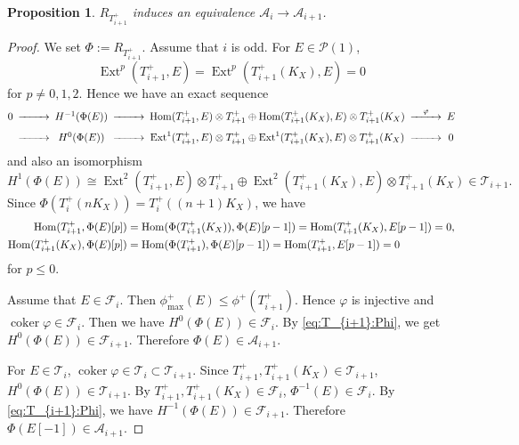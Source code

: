 \documentclass[leqno,11pt]{amsart}
\def\Ext{\mathop{\mathrm{Ext}}\nolimits}
\def\Hom{\mathop{\mathrm{Hom}}\nolimits}
\def\coker{\mathop{\mathrm{coker}}\nolimits}
\newtheorem{Prop}[Thm]{Proposition}
\theoremstyle{definition}
\def\AA{\ensuremath{\mathcal A}}
\def\FF{\ensuremath{\mathcal F}}
\def\PP{\ensuremath{\mathcal P}}
\def\TT{\ensuremath{\mathcal T}}
\begin{document}
\begin{Prop}\label{Prop:equiv1-2}
$R_{T_{i+1}^+}$ induces an equivalence
$\AA_i \to \AA_{i+1}$.
\end{Prop}

\begin{proof}
We set $\Phi:=R_{T_{i+1}^+}$.
Assume that $i$ is odd.
For $E \in \PP(1)$, 
$$
\Ext^p(T_{i+1}^+,E)=\Ext^p(T_{i+1}^+(K_X),E)=0
$$
 for $p \ne 0,1,2$.
Hence we have an exact sequence
\begin{equation}
\begin{CD}
0 @>>> H^{-1}(\Phi(E)) @>>> \Hom(T_{i+1}^+,E) \otimes T_{i+1}^+ \oplus  
\Hom(T_{i+1}^+(K_X),E) \otimes T_{i+1}^+ (K_X) @>{\varphi}>> E \\
 @>>> H^0(\Phi(E)) @>>> \Ext^1(T_{i+1}^+,E) \otimes T_{i+1}^+ \oplus  
\Ext^1(T_{i+1}^+(K_X),E) \otimes T_{i+1}^+ (K_X) @>>> 0
\end{CD}
\end{equation}
and also an isomorphism
\begin{equation}
H^1(\Phi(E)) \cong \Ext^2(T_{i+1}^+,E) \otimes T_{i+1}^+\oplus  
\Ext^2(T_{i+1}^+(K_X),E) \otimes T_{i+1}^+ (K_X) \in \TT_{i+1}.
\end{equation}
Since $\Phi(T_i^+ (nK_X))=T_i^+((n+1)K_X)$, we have
\begin{equation}\label{eq:T_{i+1}:Phi}
\begin{split}
\Hom(T_{i+1}^+,\Phi(E)[p])& =\Hom(\Phi(T_{i+1}^+(K_X)),\Phi(E)[p-1])
=\Hom(T_{i+1}^+(K_X),E[p-1])=0,\\
\Hom(T_{i+1}^+(K_X),\Phi(E)[p])&=\Hom(\Phi(T_{i+1}^+),\Phi(E)[p-1])
=\Hom(T_{i+1}^+,E[p-1])=0
\end{split}
\end{equation}
for $p \leq 0$.

Assume that $E \in \FF_i$. Then
$\phi_{\max}^+(E) \leq \phi^+(T_{i+1}^+)$. Hence 
$\varphi$ is injective and $\coker \varphi \in \FF_i$. 
Then we have $H^0(\Phi(E)) \in \FF_i$.
By \eqref{eq:T_{i+1}:Phi}, we get
$H^0(\Phi(E)) \in \FF_{i+1}$.
Therefore $\Phi(E) \in \AA_{i+1}$.

For $E \in \TT_i$, 
$\coker \varphi \in \TT_i \subset \TT_{i+1}$.
Since $T_{i+1}^+, T_{i+1}^+ (K_X)\in \TT_{i+1}$,
$H^0(\Phi(E)) \in \TT_{i+1}$.
By $T_{i+1}^+,T_{i+1}^+(K_X) \in \FF_i$, $\Phi^{-1}(E) \in \FF_i$.
By \eqref{eq:T_{i+1}:Phi}, we have
$H^{-1}(\Phi(E)) \in \FF_{i+1}$.
Therefore $\Phi(E[-1]) \in \AA_{i+1}$.




\end{proof}
\end{document}
